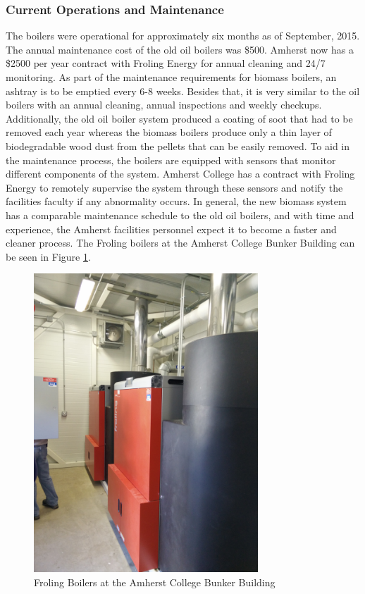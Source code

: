 \subsubsection{Current Operations and Maintenance}
\par The boilers were operational for approximately six months as of September, 2015. The annual maintenance cost of the old oil boilers was \$500. Amherst now has a \$2500 per year contract with Froling Energy for annual cleaning and 24/7 monitoring. As part of the maintenance requirements for biomass boilers, an ashtray is to be emptied every 6-8 weeks. Besides that, it is very similar to the oil boilers with an annual cleaning, annual inspections and weekly checkups. Additionally, the old oil boiler system produced a coating of soot that had to be removed each year whereas the biomass boilers produce only a thin layer of biodegradable wood dust from the pellets that can be easily removed. To aid in the maintenance process, the boilers are equipped with sensors that monitor different components of the system. Amherst College has a contract with Froling Energy to remotely supervise the system through these sensors and notify the facilities faculty if any abnormality occurs. In general, the new biomass system has a comparable maintenance schedule to the old oil boilers, and with time and experience, the Amherst facilities personnel expect it to become a faster and cleaner process. The Froling boilers at the Amherst College Bunker Building can be seen in Figure \ref{fig:amherstboilers}.
\begin{figure}[H]
\centering
\includegraphics[width=0.75\textwidth]{findingschapter/amherstboilers}
\caption{Froling Boilers at the Amherst College Bunker Building}
\label{fig:amherstboilers}
\end{figure}

